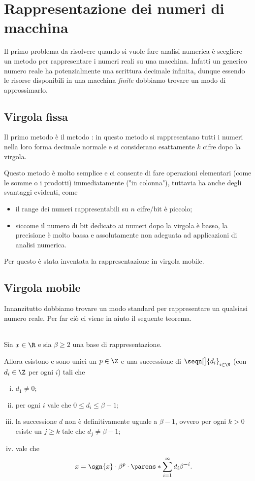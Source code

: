 \section{Rappresentazione dei numeri di macchina}

Il primo problema da risolvere quando si vuole fare analisi numerica è scegliere un metodo per rappresentare i numeri reali su una macchina. Infatti un generico numero reale ha potenzialmente una scrittura decimale infinita, dunque essendo le risorse disponibili in una macchina \emph{finite} dobbiamo trovare un modo di approssimarlo. 

\subsection{Virgola fissa}
Il primo metodo è il metodo : in questo metodo si rappresentano tutti i numeri nella loro forma decimale normale e si considerano esattamente $k$ cifre dopo la virgola.

Questo metodo è molto semplice e ci consente di fare operazioni elementari (come le somme o i prodotti) immediatamente ("in colonna"), tuttavia ha anche degli svantaggi evidenti, come \begin{itemize}
    \item il range dei numeri rappresentabili su $n$ cifre/bit è piccolo;
    \item siccome il numero di bit dedicato ai numeri dopo la virgola è basso, la precisione è molto bassa e assolutamente non adeguata ad applicazioni di analisi numerica.
\end{itemize}
Per questo è stata inventata la rappresentazione in virgola mobile.

\subsection{Virgola mobile}
Innanzitutto dobbiamo trovare un modo standard per rappresentare un qualsiasi numero reale. Per far ciò ci viene in aiuto il seguente teorema.

\begin{theorem}
    \label{th:rapp_base}\ \\
    Sia $x \in \R$ e sia $\beta \geq 2$ una base di rappresentazione. 
    
    Allora esistono e sono unici un  $p \in \Z$ e una successione di  $\seqn[\big]{d_i}_{i \in \N}$ (con $d_i \in \Z$ per ogni $i$) tali che
    \begin{enumerate}[(i)]
        \item $d_1 \neq 0$;
        \item per ogni $i$ vale che $0 \leq d_i \leq \beta - 1$;
        \item la successione $d$ non è definitivamente uguale a $\beta - 1$, ovvero per ogni $k > 0$ esiste un $j \geq k$ tale che $d_j \neq \beta - 1$;
        \item vale che \[
            x = \sgn{x} \cdot \beta^p \cdot \parens*{\sum_{i=1}^\infty d_i\beta^{-i}}.
        \] 
    \end{enumerate}
\end{theorem}

